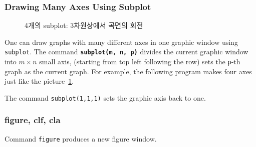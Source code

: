 \subsubsection{Drawing Many Axes Using Subplot}

\begin{figure}[]
\center {} \caption{\label{subplot}4개의 subplot:
3차원상에서 곡면의 회전}
\end{figure}

One can draw graphs with many different axes in one graphic window using {\tt subplot}. The command \texttt{\textbf{subplot(m, n, p)}} divides the current graphic window into $m \times n$ small axis, (starting from top left following the row) sets the {\tt p}-th graph as the current graph. For example, the following program makes four axes just like the picture~\ref{subplot}.

\begin{center}
\end{center}
\vn The command {\tt subplot(1,1,1)} sets the graphic axis back to one.

\subsubsection{figure, clf, cla}
Command {\tt figure} produces a new figure window. \par

